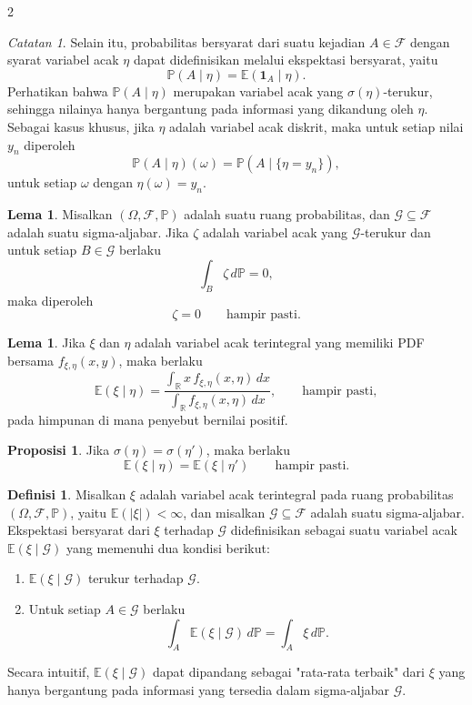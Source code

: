\documentclass[a4paper,extrafontsizes, 9pt]{memoir}
\theoremstyle{definition}
\newtheorem{definisi}[kalstok]{Definisi}
\newtheorem{lemma}[kalstok]{Lema}
\newtheorem{proposisi}[kalstok]{Proposisi}
\theoremstyle{plain}
\theoremstyle{remark}
\newtheorem{catatan}[kalstok]{Catatan}
\begin{document}
\begin{multicols}{2}
  \begin{catatan}
    Selain itu, probabilitas bersyarat dari suatu kejadian $A\in\mathcal{F}$ dengan syarat
    variabel acak $\eta$ dapat didefinisikan melalui ekspektasi bersyarat, yaitu
    \[\mathbb{P}(A\mid\eta)=\mathbb{E}(\mathbf{1}_A\mid\eta).\]
    Perhatikan bahwa $\mathbb{P}(A\mid\eta)$ merupakan variabel acak yang $\sigma(\eta)$-terukur,
    sehingga nilainya hanya bergantung pada informasi yang dikandung oleh $\eta$. Sebagai kasus
    khusus, jika $\eta$ adalah variabel acak diskrit, maka untuk setiap nilai $y_n$ diperoleh
    \[\mathbb{P}(A\mid\eta)(\omega)=\mathbb{P}(A\mid\{\eta=y_n\}),\]
    untuk setiap $\omega$ dengan $\eta(\omega)=y_n$.
  \end{catatan}

  \begin{lemma}
    Misalkan $(\Omega,\mathcal{F},\mathbb{P})$ adalah suatu ruang probabilitas, dan
    $\mathcal{G}\subseteq\mathcal{F}$ adalah suatu sigma-aljabar. Jika $\zeta$ adalah variabel
    acak yang $\mathcal{G}$-terukur dan untuk setiap $B\in\mathcal{G}$ berlaku
    \[\int_B \zeta\,d\mathbb{P}=0,\]
    maka diperoleh
    \[\zeta=0\qquad \text{hampir pasti}.\]
  \end{lemma}

  \begin{lemma}
    Jika $\xi$ dan $\eta$ adalah variabel acak terintegral yang memiliki PDF bersama
    $f_{\xi,\eta}(x,y)$, maka berlaku
    \[\mathbb{E}(\xi\mid\eta)
      =\frac{\int_{\mathbb{R}}x\,f_{\xi,\eta}(x,\eta)\,dx}
      {\int_{\mathbb{R}}f_{\xi,\eta}(x,\eta)\,dx},
      \qquad \text{hampir pasti},\]
    pada himpunan di mana penyebut bernilai positif.
  \end{lemma}

  \begin{proposisi}
    Jika $\sigma(\eta)=\sigma(\eta')$, maka berlaku
    \[\mathbb{E}(\xi\mid\eta)=\mathbb{E}(\xi\mid\eta')\qquad \text{hampir pasti}.\]
  \end{proposisi}


  \begin{definisi}
    Misalkan $\xi$ adalah variabel acak terintegral pada ruang probabilitas
    $(\Omega,\mathcal{F},\mathbb{P})$, yaitu $\mathbb{E}(|\xi|)<\infty$, dan misalkan
    $\mathcal{G}\subseteq\mathcal{F}$ adalah suatu sigma-aljabar. Ekspektasi bersyarat dari
    $\xi$ terhadap $\mathcal{G}$ didefinisikan sebagai suatu variabel acak
    $\mathbb{E}(\xi\mid\mathcal{G})$ yang memenuhi dua kondisi berikut:
    \begin{enumerate}[leftmargin=*, itemsep=0.5mm]
      \item $\mathbb{E}(\xi\mid\mathcal{G})$ terukur terhadap $\mathcal{G}$.
      \item Untuk setiap $A\in\mathcal{G}$ berlaku
            \[\int_A \mathbb{E}(\xi\mid\mathcal{G})\,d\mathbb{P}=\int_A \xi\,d\mathbb{P}.\]
    \end{enumerate}
    Secara intuitif, $\mathbb{E}(\xi\mid\mathcal{G})$ dapat dipandang sebagai "rata-rata terbaik"
    dari $\xi$ yang hanya bergantung pada informasi yang tersedia dalam sigma-aljabar
    $\mathcal{G}$.
  \end{definisi}


\end{multicols}
\end{document}
